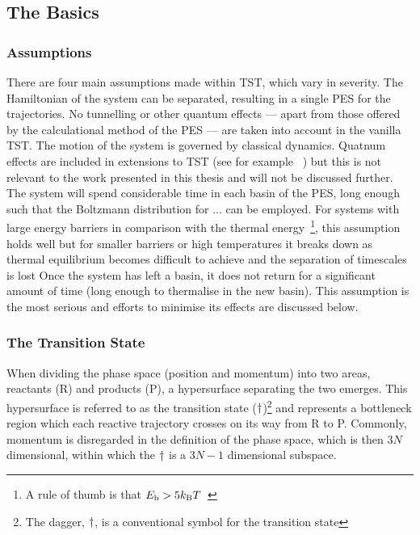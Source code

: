 \subsection{The Basics}

\subsubsection{Assumptions}
There are four main assumptions made within TST, which vary in severity.
The Hamiltonian of the system can be separated, resulting in a single PES for the trajectories.
No tunnelling or other quantum effects --- apart from those offered by the calculational method of the PES --- are taken into account in the vanilla TST.
The motion of the system is governed by classical dynamics.
Quatnum effects are included in extensions to TST (see for example \cite{qtst-hj-1997, qtst-hj-1998, qtst-hj-2009}~\citemiss) but this is not relevant to the work presented in this thesis and will not be discussed further.
The system will spend considerable time in each basin of the PES, long enough such that the Boltzmann distribution for ... can be employed.
For systems with large energy barriers in comparison with the thermal energy~\footnote{A rule of thumb is that $E_\text{b} > 5k_\text{B} T$~\citemiss}, this assumption holds well but for smaller barriers or high temperatures it breaks down as thermal equilibrium becomes difficult to achieve and the separation of timescales is lost
Once the system has left a basin, it does not return for a significant amount of time (long enough to thermalise in the new basin).
This assumption is the most serious and efforts to minimise its effects are discussed below.

\subsubsection{The Transition State}


When dividing the phase space (position and momentum) into two areas, reactants (R) and products (P), a hypersurface separating the two emerges.
This hypersurface is referred to as the transition state ($\dagger$)\footnote{The dagger, $\dagger$, is a conventional symbol for the transition state} and represents a bottleneck region which each reactive trajectory crosses on its way from R to P.
Commonly, momentum is disregarded in the definition of the phase space, which is then  $3N$ dimensional, within which the $\dagger$ is a $3N-1$ dimensional subspace.

